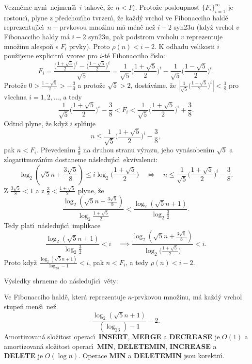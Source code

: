 \documentclass[a4paper,12pt]{article}
\begin{document}
\flushpar Vezm\v eme nyn\'\i\ nejmen\v s\'\i\ $i$ takov\'e, \v ze $
n<F_i$. Proto\v ze 
posloupnost $\{F_i\}_{i=1}^{\infty}$ je rostouc\'\i , plyne z p\v redchoz\'\i ho 
tvrzen\'\i , \v ze ka\v zd\'y vrchol ve Fibonacciho hald\v e 
reprezentuj\'\i c\'\i\ $n-$prvkovou mno\v zinu m\'a m\'en\v e ne\v z $
i-2$ 
syn\accent23u (kdy\v z vrchol $v$ Fibonacciho haldy m\'a $i-2$ 
syn\accent23u, pak podstrom vrcholu $v$ reprezentuje 
mno\v zinu alespo\v n s $F_i$ prvky). Proto $\rho (n)<i-2$. K odhadu 
velikosti $i$ pou\v zijeme explicitn\'\i\ vzorec 
pro $i$-t\'e Fibonacciho \v c\'\i slo: 
$$F_i=\frac {\big(\frac {1+\sqrt 5}2\big)^i-\big(\frac {1-\sqrt 5}
2\big)^i}{\sqrt 5}=\frac 1{\sqrt 5}\big(\frac {1+\sqrt 5}2\big)^i
-\frac 1{\sqrt 5}\big(\frac {1-\sqrt 5}2\big)^i.$$
Proto\v ze $0>\frac {1-\sqrt 5}2>-\frac 34$ a proto\v ze $\sqrt 5
>2$, dost\'av\'ame, \v ze $|\frac 1{\sqrt 5}\big(\frac {1-\sqrt 5}
2\big)^i|<\frac 38$ pro v\v sechna 
$i=1,2,\dots$, a tedy 
$$\frac 1{\sqrt 5}\big(\frac {1+\sqrt 5}2\big)^i-\frac 38<F_i<\frac 
1{\sqrt 5}\big(\frac {1+\sqrt 5}2\big)^i+\frac 38.$$
Odtud plyne, \v ze kdy\v z $i$ spl\v nuje 
$$n\le\frac 1{\sqrt 5}\big(\frac {1+\sqrt 5}2\big)^i-\frac 38,$$
pak $n<F_i$. 
P\v reveden\'\i m $\frac 38$ na druhou stranu v\'yrazu, jeho 
vyn\'asoben\'\i m $\sqrt 5$ a zlogaritmov\'an\'\i m dostaneme n\'asleduj\'\i c\'\i\ 
ekvivalenci: 
$$\log_2(\sqrt 5n+\frac {3\sqrt 5}8)\le i\log_2\big(\frac {1+\sqrt 
5}2\big)\quad\Leftrightarrow\quad n\le\frac 1{\sqrt 5}\big(\frac {
1+\sqrt 5}2\big)^i-\frac 38.$$
Z $\frac {3\sqrt 5}8<1$ a z $\frac 32<\frac {1+\sqrt 5}2$ plyne, \v ze 
$$\frac {\log_2(\sqrt 5n+\frac {3\sqrt 5}8)}{\log_2\frac {1+\sqrt 
5}2}<\frac {\log_2(\sqrt 5n+1)}{\log_2\frac 32}.$$
Tedy plat\'\i\ n\'asleduj\'\i c\'\i\ implikace
$$\frac {\log_2(\sqrt 5n+1)}{\log_2\frac 32}<i\quad\implies\frac {\log_
2(\sqrt 5n+\frac {3\sqrt 5}8)}{\log_2\big(\frac {1+\sqrt 5}2\big)}
<i.$$
Proto kdy\v z $\frac {\log_2(\sqrt 5n+1)}{\log_23-1}<i$, pak $n<F_
i$, a tedy $\rho (n)<i-2$.
\medskip

\flushpar V\'ysledky shrneme do n\'asleduj\'\i c\'\i\ v\v ety: 
\medskip

Ve Fibonacciho hald\v e, kter\'a   
reprezentuje $n$-prvkovou mno\v zinu, m\'a ka\v zd\'y vrchol 
stu\-pe\v n men\v s\'\i\ ne\v z 
$$\frac {\log_2(\sqrt 5n+1)}{(\log_23)-1}-2.$$
Amortizovan\'a slo\v zitost operac\'\i\ {\bf INSERT}, {\bf MERGE} a {\bf DECREASE }
je $O(1)$ a amortizovan\'a slo\v zitost operac\'\i\ {\bf MIN}, 
{\bf DE\-LE\-TE\-MIN}, {\bf INCREASE} a {\bf DELETE} je $O(\log n
)$. Operace {\bf MIN }
a {\bf DELETEMIN} jsou korektn\'\i .
\endproclaim
\medskip
\end{document}
